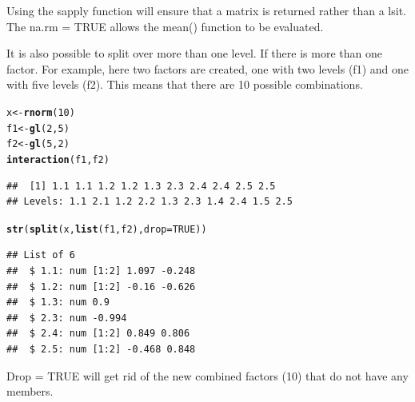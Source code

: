 \documentclass{article}\usepackage{graphicx, color}
\makeatletter
\newcommand{\hlfunctioncall}[1]{\textcolor[rgb]{0.501960784313725,0,0.329411764705882}{\textbf{#1}}}%
\newenvironment{kframe}{%
 \def\at@end@of@kframe{}%
 \ifinner\ifhmode%
  \def\at@end@of@kframe{\end{minipage}}%
  \begin{minipage}{\columnwidth}%
 \fi\fi%
 \def\FrameCommand##1{\hskip\@totalleftmargin \hskip-\fboxsep
 \colorbox{shadecolor}{##1}\hskip-\fboxsep
     \hskip-\linewidth \hskip-\@totalleftmargin \hskip\columnwidth}%
 \MakeFramed {\advance\hsize-\width
   \@totalleftmargin\z@ \linewidth\hsize
   \@setminipage}}%
 {\par\unskip\endMakeFramed%
 \at@end@of@kframe}
\newenvironment{knitrout}{}{} %
\makeatother
\begin{document}
Using the sapply function will ensure that a matrix is returned rather than a lsit.  The na.rm = TRUE allows the mean() function to be evaluated. 

It is also possible to split over more than one level.  If there is more than one factor. For example, here two factors are created, one with two levels (f1) and one with five levels (f2).  This means that there are 10 possible combinations.  
\begin{knitrout}
\color{fgcolor}\begin{kframe}
\begin{alltt}
x <- \hlfunctioncall{rnorm}(10)
f1 <- \hlfunctioncall{gl}(2, 5)
f2 <- \hlfunctioncall{gl}(5, 2)
\hlfunctioncall{interaction}(f1, f2)
\end{alltt}
\begin{verbatim}
##  [1] 1.1 1.1 1.2 1.2 1.3 2.3 2.4 2.4 2.5 2.5
## Levels: 1.1 2.1 1.2 2.2 1.3 2.3 1.4 2.4 1.5 2.5
\end{verbatim}
\begin{alltt}
\hlfunctioncall{str}(\hlfunctioncall{split}(x, \hlfunctioncall{list}(f1, f2), drop = TRUE))
\end{alltt}
\begin{verbatim}
## List of 6
##  $ 1.1: num [1:2] 1.097 -0.248
##  $ 1.2: num [1:2] -0.16 -0.626
##  $ 1.3: num 0.9
##  $ 2.3: num -0.994
##  $ 2.4: num [1:2] 0.849 0.806
##  $ 2.5: num [1:2] -0.468 0.848
\end{verbatim}
\end{kframe}
\end{knitrout}

Drop = TRUE will get rid of the new combined factors (10) that do not have any members. 
\end{document}
